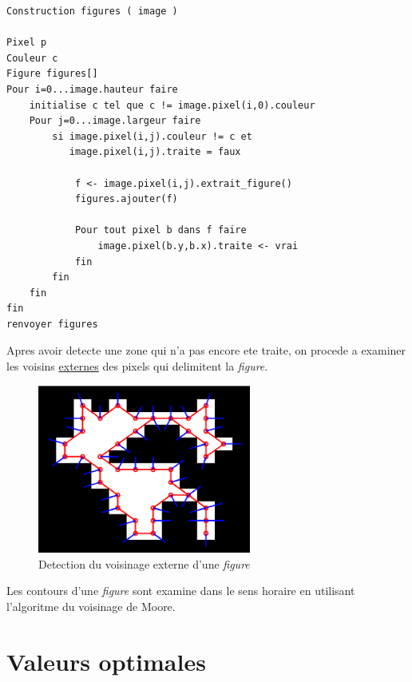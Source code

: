 \documentclass[twoside,openright,a4paper,11pt,french]{article}
\begin{document}
\begin{lstlisting}[frame=single]  % Start your code-block
Construction figures ( image )

Pixel p
Couleur c
Figure figures[]
Pour i=0...image.hauteur faire
    initialise c tel que c != image.pixel(i,0).couleur 
    Pour j=0...image.largeur faire
        si image.pixel(i,j).couleur != c et 
           image.pixel(i,j).traite = faux

            f <- image.pixel(i,j).extrait_figure()
            figures.ajouter(f)

            Pour tout pixel b dans f faire
                image.pixel(b.y,b.x).traite <- vrai
            fin 
        fin 
    fin
fin
renvoyer figures
\end{lstlisting}


Apres avoir detecte une zone qui n'a pas encore ete traite, on procede
a examiner les voisins \underline{externes} des pixels qui delimitent
la {\it figure}.

\begin{figure}[h]
\centering
\includegraphics[width=7cm]{./pics/moore.eps}
\caption{Detection du voisinage externe d'une {\it figure}}
\label{fig:moore}
\end{figure}

Les contours d'une {\it figure} sont examine dans le sens horaire en
utilisant l'algoritme du voisinage de Moore.




\section{Valeurs optimales}
\end{document}
